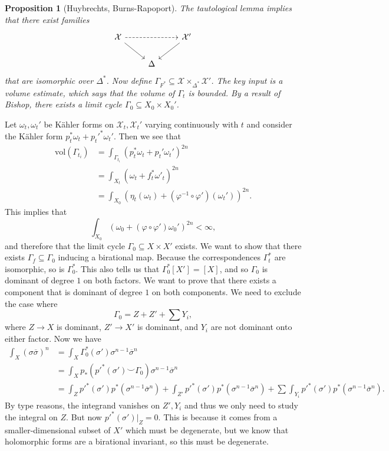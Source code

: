 \documentclass[leqno, openany]{memoir}
\newtheorem{prop}[thm]{Proposition}
\theoremstyle{definition}
\theoremstyle{remark}
\theoremstyle{plain}
\theoremstyle{definition}
\theoremstyle{remark}
\newcommand{\mc}[1]{\mathcal{#1}}
\newcommand{\mr}[1]{\mathrm{#1}}
\newcommand{\ol}[1]{\overline{#1}}
\begin{document}
\begin{prop}[Huybrechts, Burns-Rapoport]
    The tautological lemma implies that there exist families
    \begin{equation*}
    \begin{tikzcd}
        \mc{X} \ar[dashrightarrow]{rr} \ar{dr} & & \mc{X}' \ar{dl} \\
        & \Delta
    \end{tikzcd}
    \end{equation*}
    that are isomorphic over $\Delta^*$. Now define $\Gamma_{F^*} \subseteq \mc{X} \times_{\Delta^*} \mc{X}'$. The key input is a volume estimate, which says that the volume of $\Gamma_{t}$ is bounded. By a result of Bishop, there exists a limit cycle $\Gamma_0 \subseteq X_0 \times X_0'$.
\end{prop}

Let $\omega_t, \omega_t'$ be K\"ahler forms on $\mc{X}_t, \mc{X}_t'$ varying continuously with $t$ and consider the K\"ahler form $p_t^* \omega_t + p_t'^* \omega_t'$. Then we see that
\begin{align*}
    \mr{vol}(\Gamma_{t_i}) &= \int_{\Gamma_{t_i}} (p_t^* \omega_t + p_t' \omega_t')^{2n} \\ 
    &= \int_{X_t} (\omega_t + f_t^* \omega'_t)^{2n} \\
    &= \int_{X_0} (\eta_t(\omega_t) + (\varphi^{-1} \circ \varphi')(\omega_t'))^{2n}. 
\end{align*}
This implies that
\[ \int_{X_0} (\omega_0 + (\varphi \circ \varphi')\omega_0')^{2n} < \infty, \]
and therefore that the limit cycle $\Gamma_0 \subseteq X \times X'$ exists. We want to show that there exists $\Gamma_f \subseteq \Gamma_0$ inducing a birational map. Because the correspondences $\Gamma_t^*$ are isomorphic, so is $\Gamma_0^*$. This also tells us that $\Gamma_0^* [X'] = [X]$, and so $\Gamma_0$ is dominant of degree $1$ on both factors. We want to prove that there exists a component that is dominant of degree $1$ on both components. We need to exclude the case where
\[ \Gamma_0 = Z + Z' + \sum Y_i, \]
where $Z \to X$ is dominant, $Z' \to X'$ is dominant, and $Y_i$ are not dominant onto either factor. Now we have
\begin{align*}
    \int_X (\sigma \ol{\sigma})^n &= \int_X \Gamma_0^* (\sigma') \sigma^{n-1} \ol{\sigma}^n \\
    &= \int_X p_* (p'^* (\sigma') \smile \Gamma_0) \sigma^{n-1} \ol{\sigma}^n \\
    &= \int_Z p'^* (\sigma') p^*(\sigma^{n-1} \ol{\sigma}^n) + \int_{Z'} p'^*(\sigma') p^*(\sigma^{n-1} \ol{\sigma}^n)+ \sum \int_{Y_i} p'^*(\sigma') p^*(\sigma^{n-1} \ol{\sigma}^n).
\end{align*}
By type reasons, the integrand vanishes on $Z', Y_i$ and thus we only need to study the integral on $Z$. But now $p'^*(\sigma') |_Z = 0$. This is because it comes from a smaller-dimensional subset of $X'$ which must be degenerate, but we know that holomorphic forms are a birational invariant, so this must be degenerate.
\end{document}
